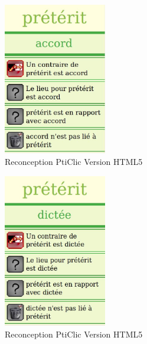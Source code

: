 \documentclass{beamer}
\begin{document}
\begin{frame}  
\begin{figure}[h!]
  \centering
      \includegraphics[width=0.4\textwidth]{img/preterit06.jpg}
\caption{Reconception PtiClic Version HTML5}
\end{figure}
\end{frame}

\begin{frame}  
\begin{figure}[h!]
  \centering
      \includegraphics[width=0.4\textwidth]{img/preterit07.jpg}
\caption{Reconception PtiClic Version HTML5}
\end{figure}
\end{frame}
\end{document}
